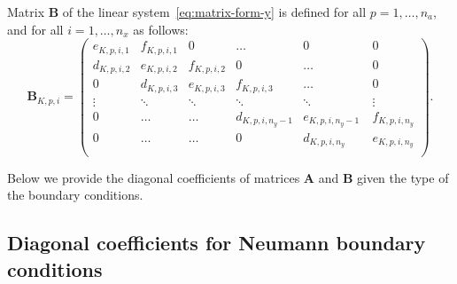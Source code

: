 \noindent Matrix $\mathbf{B}$ of the linear system~\eqref{eq:matrix-form-y} is defined for all $p=1,\dots,n_a$, and for all $i=1,\dots,n_x$ as follows:
\begin{equation}
  \label{eq:B-matrix}
  \mathbf{B}_{K,p,i}=\left(
    \begin{array}{cccccc}
      e_{K,p,i,1} & f_{K,p,i,1} & 0 & \ldots & 0 & 0\\
      d_{K,p,i,2} & e_{K,p,i,2} & f_{K,p,i,2} & 0 & \ldots & 0\\
      0 & d_{K,p,i,3} & e_{K,p,i,3} & f_{K,p,i,3} & \ldots & 0\\
      \vdots & \ddots & \ddots & \ddots & \ddots & \vdots\\
      0 & \ldots & \ldots & d_{K,p,i,n_y-1} & e_{K,p,i,n_y-1}\ & f_{K,p,i,n_y}\\
      0 & \ldots & \ldots & 0 & d_{K,p,i,n_y} & e_{K,p,i,n_y}\\
    \end{array}
  \right).
\end{equation}

Below we provide the diagonal coefficients of matrices $\mathbf{A}$ and $\mathbf{B}$ given the type of the boundary conditions. 

\subsection{Diagonal coefficients for Neumann boundary conditions} \mbox{}\\

